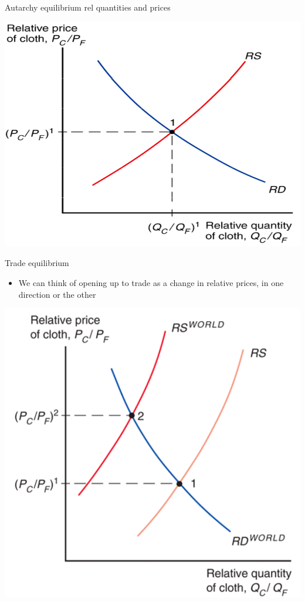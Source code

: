 \documentclass[ignorenonframetext,]{beamer}
\begin{document}
\begin{frame}{Autarchy equilibrium rel quantities and prices}

    \includegraphics[scale=0.25]{aut_equib_rel.png}

\end{frame}

\begin{frame}{Trade equilibrium}

    \begin{itemize}
        \item We can think of opening up to trade as a change in relative prices, in one direction or the other
    \end{itemize}
        \includegraphics[scale=0.25]{trade_equil.png}

\end{frame}
\end{document}
